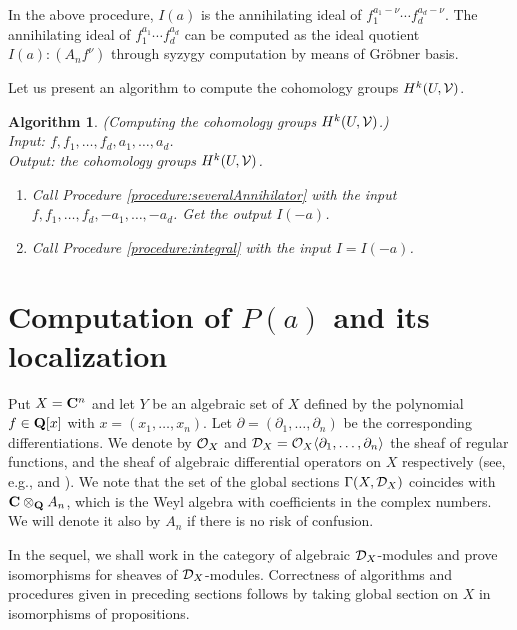 \documentclass[12pt]{article}
\def\pd#1{ \partial_{#1} }
\def\C{{\bf C}}
\def\Q{{\bf Q}}
\def\Dsc{ {\cal D} }
\def\Osc{ {\cal O} }
\def\Vsc{ {\cal V} }
\newtheorem{algorithm}[theorem]{Algorithm}
\begin{document}
In the above procedure,  $I(a)$ is the annihilating ideal of 
$f_1^{a_1-\nu}\cdots f_d^{a_d-\nu}$.  
The annihilating ideal of $f_1^{a_1}\cdots f_d^{a_d}$ can be computed
as the ideal quotient $I(a):(A_n f^\nu)$ through syzygy computation 
by means of Gr\"obner basis.     

Let us present an algorithm to compute the cohomology groups
 $H^k(U, {\cal V})$.

\begin{algorithm} \rm
\label{algorithm:cohomology-top2}
(Computing the cohomology groups $H^k(U,\Vsc)$.)
\\

\noindent
Input: $f, f_1, \ldots, f_d, a_1, \ldots, a_d$. \\
Output: the cohomology groups $H^k(U,\Vsc)$.


\begin{enumerate}
\item Call Procedure \ref{procedure:severalAnnihilator} with the input
$f, f_1, \ldots, f_d, -a_1, \ldots, -a_d$.
Get the output $I(-a)$.
\item Call Procedure \ref{procedure:integral} 
with the input $I = I(-a)$.
\end{enumerate}
\end{algorithm}



\section{Computation of $P(a)$ and its localization}

\setcounter{equation}{0}

Put $X = \C^n$ and let $Y$ be an algebraic set of $X$ defined by 
the polynomial $f \in \Q[x]$ with $x = (x_1,\dots,x_n)$. 
Let $\partial = (\partial_1,\dots,\partial_n)$ be the corresponding
differentiations.   
We denote by $\Osc_X$ and 
$\Dsc_X=\Osc_X \langle \pd{1}, \ldots, \pd{n} \rangle$ 
the sheaf of regular functions,  and
the sheaf of algebraic differential operators on $X$ respectively  
(see, e.g., \cite[p.15 and p.70]{HartshornBook} and \cite[p.15]{HottaTanisaki}).
We note that the set of the global sections
$\Gamma(X, \Dsc_X)$ coincides with $\C\otimes_{\Q}A_n$,
which is the Weyl algebra with coefficients in the complex numbers.
We will denote it also by $A_n$ if there is no risk of confusion.


In the sequel, we shall work in the category of algebraic $\Dsc_X$-modules
and prove isomorphisms for sheaves of $\Dsc_X$-modules.
Correctness of algorithms and procedures given in preceding sections follows 
by taking global section on $X$ in isomorphisms of propositions.
\end{document}
